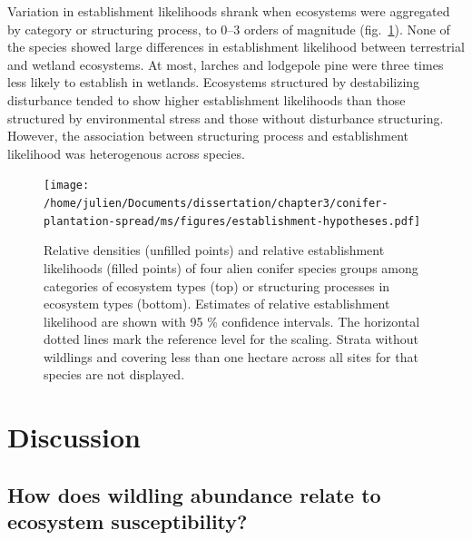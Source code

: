 \documentclass[
]{article}
\begin{document}
Variation in establishment likelihoods shrank when ecosystems were aggregated by category or structuring process, to 0--3 orders of magnitude (fig.~\ref{fig:establishment-hypotheses}).
None of the species showed large differences in establishment likelihood between terrestrial and wetland ecosystems.
At most, larches and lodgepole pine were three times less likely to establish in wetlands.
Ecosystems structured by destabilizing disturbance tended to show higher establishment likelihoods than those structured by environmental stress and those without disturbance structuring.
However, the association between structuring process and establishment likelihood was heterogenous across species.

\newpage
\begin{landscape}

\begin{figure}
\centering
\texttt{[image: /home/julien/Documents/dissertation/chapter3/conifer-plantation-spread/ms/figures/establishment-hypotheses.pdf]}
\caption{\label{fig:establishment-hypotheses}Relative densities (unfilled points) and relative establishment likelihoods (filled points) of four alien conifer species groups among categories of ecosystem types (top) or structuring processes in ecosystem types (bottom). Estimates of relative establishment likelihood are shown with 95 \% confidence intervals. The horizontal dotted lines mark the reference level for the scaling. Strata without wildlings and covering less than one hectare across all sites for that species are not displayed.}
\end{figure}

\end{landscape}
\newpage

\hypertarget{discussion}{%
\section{Discussion}\label{discussion}}

\hypertarget{how-does-wildling-abundance-relate-to-ecosystem-susceptibility}{%
\subsection{How does wildling abundance relate to ecosystem susceptibility?}\label{how-does-wildling-abundance-relate-to-ecosystem-susceptibility}}
\end{document}
